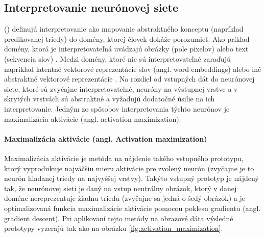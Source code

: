





\subsection{Interpretovanie neurónovej siete}

\citeauthor{montavon2018methods} (\citeyear{montavon2018methods}) definujú interpretovanie ako mapovanie abstraktného konceptu (napríklad predikovanej triedy) do domény, ktorej človek dokáže porozumieť. Ako príklad domény, ktorá je interpretovateľná uvádzajú obrázky (pole pixelov) alebo text (sekvencia slov) \cite{montavon2018methods}. Medzi domény, ktoré nie sú interpretovateľné zaraďujú napríklad latentné vektorové reprezentácie slov (angl. word embeddings) alebo iné abstraktné vektorové reprezentácie \cite{montavon2018methods}.
Na rozdiel od vstupných dát do neurónovej siete, ktoré sú zvyčajne interpretovatelné, neuróny na výstupnej vrstve a v skrytých vrstvách sú abstraktné a vyžadujú dodatočné úsilie na ich interpretovanie. Jedným zo spôsobov interpretovania týchto neurónov je maximalizácia aktivácie (angl. activation maximization).

\paragraph{Maximalizácia aktivácie (angl. Activation maximization)}
Maximalizácia aktivácie je metóda na nájdenie takého vstupného prototypu, ktorý vyprodukuje najväčšiu mieru aktivácie pre zvolený neurón (zvyčajne je to neurón hľadanej triedy na najvyššej vrstvy). 
Takýto vstupný prototyp je nájdený tak, že neurónovej sieti je daný na vstup neutrálny obrázok, ktorý v danej doméne nereprezentuje žiadnu triedu (zvyčajne sa jedná o šedý obrázok) a je optimalizovaná funkcia maximalizácie aktivácie pomocou poklesu gradientu \cite{montavon2018methods} (angl. gradient descent). Pri aplikovaní tejto metódy na obrazové dáta výsledné prototypy vyzerajú tak ako na obrázku \ref{fig:activation_maximization}.

